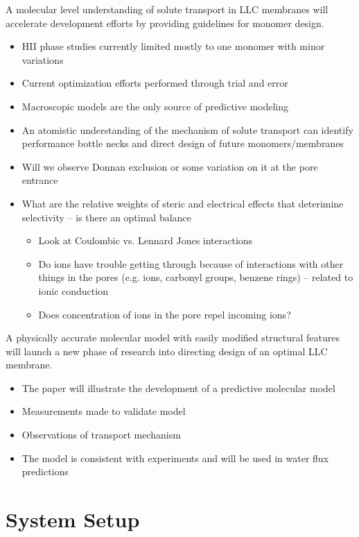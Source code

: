 \documentclass{article}
\begin{document}
	A molecular level understanding of solute transport in LLC membranes will accelerate development efforts by providing guidelines for monomer design.
	\begin{itemize}
		\item HII phase studies currently limited mostly to one monomer with minor variations
		\item Current optimization efforts performed through trial and error
		\item Macroscopic models are the only source of predictive modeling
		\item An atomistic understanding of the mechanism of solute transport can identify
		performance bottle necks and direct design of future monomers/membranes
		\item Will we observe Donnan exclusion or some variation on it at the pore entrance
		\item What are the relative weights of steric and electrical effects that deterimine selectivity -- is there an optimal balance
		\begin{itemize}
			\item Look at Coulombic vs. Lennard Jones interactions
			\item Do ions have trouble getting through because of interactions with other things in the pores (e.g. ions, carbonyl groups, benzene rings) -- related to ionic conduction
			\item Does concentration of ions in the pore repel incoming ions?
		\end{itemize}
	\end{itemize}
	
	A physically accurate molecular model with easily modified structural features will launch a new phase of research into directing design of an optimal LLC membrane.
	\begin{itemize}
		\item The paper will illustrate the development of a predictive molecular model
		\item Measurements made to validate model
		\item Observations of transport mechanism
		\item The model is consistent with experiments and will be used in water flux predictions
	\end{itemize}
	
	\section{System Setup}
	
\end{document}
